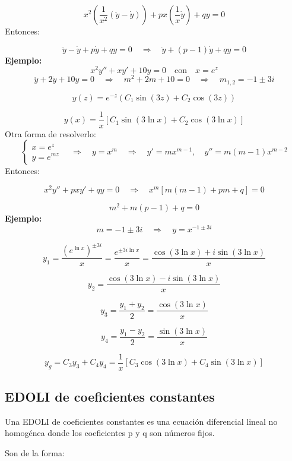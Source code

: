 \documentclass[a4paper,12pt]{article}
\begin{document}
\[
x^2 \left(\frac{1}{x^2}(\ddot{y} - \dot{y})\right) + p x \left(\frac{1}{x}\dot{y}\right) + q y = 0
\]
Entonces:

\[
\ddot{y} - \dot{y} + p \dot{y} + q y = 0 
\quad \Rightarrow \quad 
\ddot{y} + (p - 1)\dot{y} + q y = 0
\]
\noindent
\textbf{Ejemplo:}
\vspace{0,4 em}
\[
x^2 y'' + x y' + 10y = 0 
\quad \text{con} \quad x = e^z
\]
\vspace{-0,4 em}
\[
\ddot{y} + 2\dot{y} + 10y = 0 
\quad \Rightarrow \quad 
m^2 + 2m + 10 = 0 
\quad \Rightarrow \quad 
m_{1,2} = -1 \pm 3i
\]

\[
y(z) = e^{-z} \left( C_1 \sin(3z) + C_2 \cos(3z) \right)
\]

\[
y(x) = \frac{1}{x} \left[ C_1 \sin(3\ln x) + C_2 \cos(3\ln x) \right]
\]
Otra forma de resolverlo:
\vspace{0,2 em}
\[
\begin{cases}
x = e^z \\
y = e^{m z}
\end{cases}
\quad \Rightarrow \quad
y = x^m \quad \Rightarrow \quad 
y' = m x^{m-1}, \quad y'' = m(m-1)x^{m-2}
\]
Entonces:

\[
x^2 y'' + p x y' + q y = 0 
\quad \Rightarrow \quad 
x^m [ m(m-1) + p m + q ] = 0
\]

\[
m^2 + m(p - 1) + q = 0
\]
\noindent
\textbf{Ejemplo:}
\vspace{0,4 em}
\[
m = -1 \pm 3i 
\quad \Rightarrow \quad 
y = x^{-1 \pm 3i} 
\]

\[
y_1 = \frac{(e^{\ln x})^{\pm 3i}}{x} 
= \frac{e^{\pm 3i \ln x}}{x}
= \frac{\cos(3\ln x) + i\sin(3\ln x)}{x}
\]

\[
y_2 = \frac{\cos(3\ln x) - i\sin(3\ln x)}{x}
\]

\[
y_3 = \frac{y_1 + y_2}{2} = \frac{\cos(3\ln x)}{x}
\]

\[
y_4 = \frac{y_1 - y_2}{2} = \frac{\sin(3\ln x)}{x}
\]

\[
y_g = C_3 y_3 + C_4 y_4 
= \frac{1}{x} [ C_3 \cos(3\ln x) + C_4 \sin(3\ln x) ]
\]

\subsection{EDOLI de coeficientes constantes}
\noindent
Una EDOLI de coeficientes constantes es una ecuación diferencial lineal no homogénea donde los coeficientes p y q son números fijos.

\medskip
\noindent
Son de la forma:
\end{document}
